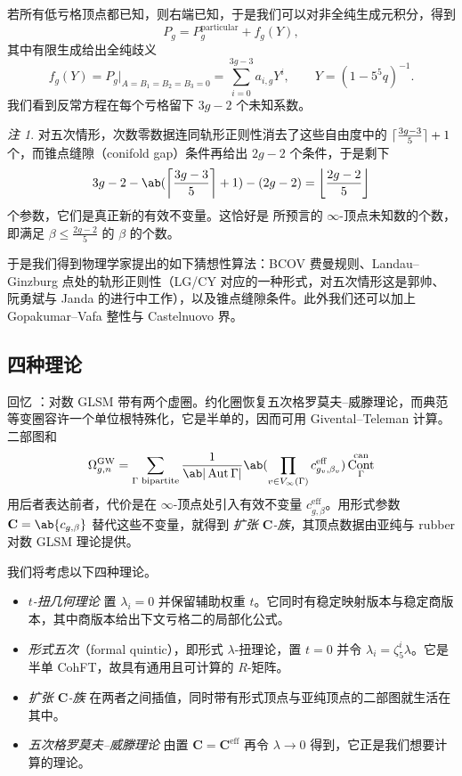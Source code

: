 \documentclass{amsart}
\theoremstyle{definition}
\theoremstyle{remark}
\newtheorem{rmk}[thm]{注}
\theoremstyle{plain}
\theoremstyle{definition}
\theoremstyle{remark}
\DeclarePairedDelimiter{\floor}{\lfloor}{\rfloor}
\DeclarePairedDelimiter{\ceil}{\lceil}{\rceil}
\newcommand{\mbf}[1]{\mathbf{#1}}
\newcommand{\mr}[1]{\mathrm{#1}}
\newcommand{\1}{\mathbf{1}}
\newcommand{\2}{\mathbf{2}}
\newcommand{\3}{\mathbf{3}}
\DeclareMathOperator{\Aut}{Aut}
\DeclareMathOperator{\Cont}{Cont}
\begin{document}
若所有低亏格顶点都已知，则右端已知，于是我们可以对非全纯生成元积分，得到
\[ P_g = P_g^{\mr{particular}} + f_g(Y), \]
其中有限生成给出全纯歧义
\[ f_g(Y) = P_g|_{A = B_1 = B_2 = B_3 = 0} = \sum_{i=0}^{3g-3}a_{i,g}Y^i, \qquad Y = (1-5^5q)^{-1}. \]
我们看到反常方程在每个亏格留下 \(3g-2\) 个未知系数。

\begin{rmk}
    对五次情形，次数零数据连同轨形正则性消去了这些自由度中的 \(\ceil{\frac{3g-3}{5}}+1\) 个，而锥点缝隙（conifold gap）条件再给出 \(2g-2\) 个条件，于是剩下
    \[ 3g-2 - \ab(\ceil*{\frac{3g-3}{5}}+1) - (2g-2) = \floor*{\frac{2g-2}{5}} \]
    个参数，它们是真正新的有效不变量。这恰好是  所预言的 \(\infty\)-顶点未知数的个数，即满足 \(\beta \leq \frac{2g-2}{5}\) 的 \(\beta\) 的个数。
\end{rmk}

于是我们得到物理学家提出的如下猜想性算法：BCOV 费曼规则、Landau–Ginzburg 点处的轨形正则性（LG/CY 对应的一种形式，对五次情形这是郭帅、阮勇斌与 Janda 的进行中工作），以及锥点缝隙条件。此外我们还可以加上 Gopakumar–Vafa 整性与 Castelnuovo 界。

\subsection{四种理论}%
\label{sub:Four theories}

回忆 ：对数 GLSM 带有两个虚圈。约化圈恢复五次格罗莫夫–威滕理论，而典范等变圈容许一个单位根特殊化，它是半单的，因而可用 Givental–Teleman 计算。二部图和
\[ \Omega^{\mr{GW}}_{g,n} = \sum_{\Gamma \text{ bipartite}} \frac{1}{\ab|\Aut \Gamma|} \ab( \prod_{v \in V_{\infty}(\Gamma)} c^{\mr{eff}}_{g_v,\beta_v}) \Cont^{\mr{can}}_{\Gamma} \]
用后者表达前者，代价是在 \(\infty\)-顶点处引入有效不变量 \(c^{\mr{eff}}_{g,\beta}\)。用形式参数 \(\mbf{C} = \ab\{c_{g,\beta}\}\) 替代这些不变量，就得到 \textit{扩张 \(\mbf{C}\)-族}，其顶点数据由亚纯与 rubber 对数 GLSM 理论提供。

我们将考虑以下四种理论。
\begin{itemize}
    \item \textit{\(t\)-扭几何理论} 置 \(\lambda_i = 0\) 并保留辅助权重 \(t\)。它同时有稳定映射版本与稳定商版本，其中商版本给出下文亏格二的局部化公式。
    \item \textit{形式五次}（formal quintic），即形式 \(\lambda\)-扭理论，置 \(t = 0\) 并令 \(\lambda_i = \zeta_5^i \lambda\)。它是半单 CohFT，故具有通用且可计算的 \(R\)-矩阵。
    \item \textit{扩张 \(\mbf{C}\)-族} 在两者之间插值，同时带有形式顶点与亚纯顶点的二部图就生活在其中。
    \item \textit{五次格罗莫夫–威滕理论} 由置 \(\mbf{C} = \mbf{C}^{\mr{eff}}\) 再令 \(\lambda \to 0\) 得到，它正是我们想要计算的理论。
\end{itemize}
\end{document}
